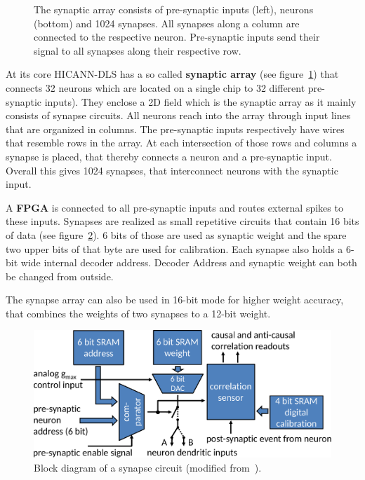 \begin{figure}[h!]
    \centering
    
    \caption{\label{fig:array} The synaptic array consists of pre-synaptic inputs (left), neurons (bottom) and 1024 synapses. All synapses along a column are connected to the respective neuron. Pre-synaptic inputs send their signal to all synapses along their respective row.}
\end{figure}
At its core \ac{HICANN-DLS} has a so called \textbf{synaptic array} (see figure~\ref{fig:array}) that connects 32 neurons which are located on a single chip to 32 different pre-synaptic inputs).
They enclose a 2D field which is the synaptic array as it mainly consists of synapse circuits.
All neurons reach into the array through input lines that are organized in columns.
The pre-synaptic inputs respectively have wires that resemble rows in the array.
At each intersection of those rows and columns a synapse is placed, that thereby connects a neuron and a pre-synaptic input.
Overall this gives 1024 synapses, that interconnect neurons with the synaptic input.

A \textbf{\ac{FPGA}} is connected to all pre-synaptic inputs and routes external spikes to these inputs.
Synapses are realized as small repetitive circuits that contain 16 bits of data (see figure~\ref{fig:circuit}).
6 bits of those are used as synaptic weight and the spare two upper bits of that byte are used for calibration.
Each synapse also holds a 6-bit wide internal decoder address.
Decoder Address and synaptic weight can both be changed from outside.

The synapse array can also be used in 16-bit mode for higher weight accuracy, that combines the weights of two synapses to a 12-bit weight.
\begin{figure}[htbp]
    \centering
    \includegraphics[width=\textwidth]{pictures/syncircuit.pdf}
    \caption{\label{fig:circuit} Block diagram of a synapse circuit (modified from~\citeauthor{PPU}).}
\end{figure}

